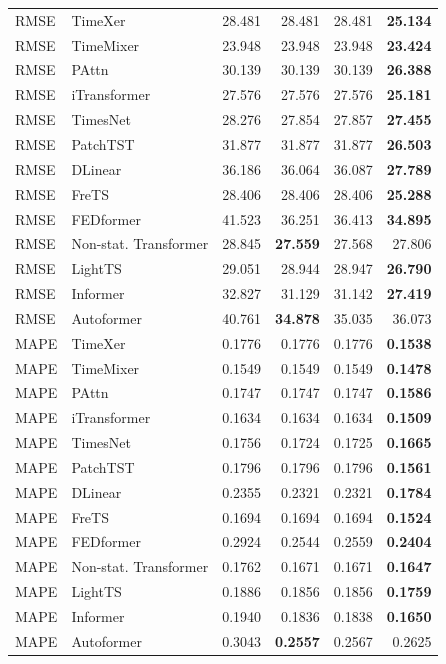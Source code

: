 \begin{longtable}{llrrrr}
\midrule
RMSE & TimeXer & 28.481 & 28.481 & 28.481 & \textbf{25.134} \\
RMSE & TimeMixer & 23.948 & 23.948 & 23.948 & \textbf{23.424} \\
RMSE & PAttn & 30.139 & 30.139 & 30.139 & \textbf{26.388} \\
RMSE & iTransformer & 27.576 & 27.576 & 27.576 & \textbf{25.181} \\
RMSE & TimesNet & 28.276 & 27.854 & 27.857 & \textbf{27.455} \\
RMSE & PatchTST & 31.877 & 31.877 & 31.877 & \textbf{26.503} \\
RMSE & DLinear & 36.186 & 36.064 & 36.087 & \textbf{27.789} \\
RMSE & FreTS & 28.406 & 28.406 & 28.406 & \textbf{25.288} \\
RMSE & FEDformer & 41.523 & 36.251 & 36.413 & \textbf{34.895} \\
RMSE & Non-stat. Transformer & 28.845 & \textbf{27.559} & 27.568 & 27.806 \\
RMSE & LightTS & 29.051 & 28.944 & 28.947 & \textbf{26.790} \\
RMSE & Informer & 32.827 & 31.129 & 31.142 & \textbf{27.419} \\
RMSE & Autoformer & 40.761 & \textbf{34.878} & 35.035 & 36.073 \\
\midrule
MAPE & TimeXer & 0.1776 & 0.1776 & 0.1776 & \textbf{0.1538} \\
MAPE & TimeMixer & 0.1549 & 0.1549 & 0.1549 & \textbf{0.1478} \\
MAPE & PAttn & 0.1747 & 0.1747 & 0.1747 & \textbf{0.1586} \\
MAPE & iTransformer & 0.1634 & 0.1634 & 0.1634 & \textbf{0.1509} \\
MAPE & TimesNet & 0.1756 & 0.1724 & 0.1725 & \textbf{0.1665} \\
MAPE & PatchTST & 0.1796 & 0.1796 & 0.1796 & \textbf{0.1561} \\
MAPE & DLinear & 0.2355 & 0.2321 & 0.2321 & \textbf{0.1784} \\
MAPE & FreTS & 0.1694 & 0.1694 & 0.1694 & \textbf{0.1524} \\
MAPE & FEDformer & 0.2924 & 0.2544 & 0.2559 & \textbf{0.2404} \\
MAPE & Non-stat. Transformer & 0.1762 & 0.1671 & 0.1671 & \textbf{0.1647} \\
MAPE & LightTS & 0.1886 & 0.1856 & 0.1856 & \textbf{0.1759} \\
MAPE & Informer & 0.1940 & 0.1836 & 0.1838 & \textbf{0.1650} \\
MAPE & Autoformer & 0.3043 & \textbf{0.2557} & 0.2567 & 0.2625 \\
\end{longtable}
\endgroup

